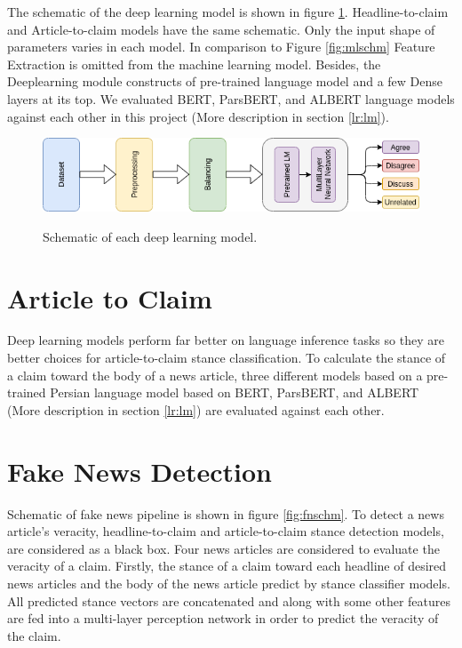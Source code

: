 The schematic of the deep learning model is shown in figure \ref{fig:dlschm}. Headline-to-claim and Article-to-claim models have the same schematic. Only the input shape of parameters varies in each model. In comparison to Figure \ref{fig:mlschm} Feature Extraction is omitted from the machine learning model. Besides, the Deeplearning module constructs of pre-trained language model and a few Dense layers at its top. We evaluated BERT, ParsBERT, and ALBERT language models against each other in this project (More description in section \ref{lr:lm}).
\begin{figure}%
	\centering
	{\includegraphics[width=14.5cm]{statistics/schema/dl.png} }
	\caption{Schematic of each deep learning model.}%
	\label{fig:dlschm}%
\end{figure}


\section{Article to Claim}
\label{mth:a2c}
Deep learning models perform far better on language inference tasks so they are better choices for article-to-claim stance classification. To calculate the stance of a claim toward the body of a news article, three different models based on a pre-trained Persian language model based on BERT, ParsBERT, and  ALBERT (More description in section \ref{lr:lm}) are evaluated against each other. 

\section{Fake News Detection}
\label{mth:fn}
	\label{sec:fakenews}
Schematic of fake news pipeline is shown in figure \ref{fig:fnschm}. To detect a news article's veracity, headline-to-claim and article-to-claim stance detection models, are considered as a black box. Four news articles are considered to evaluate the veracity of a claim. Firstly, the stance of a claim toward each headline of desired news articles and the body of the news article predict by stance classifier models. All predicted stance vectors are concatenated and along with some other features are fed into a multi-layer perception network in order to predict the veracity of the claim.

